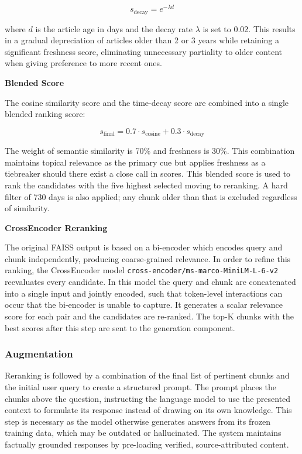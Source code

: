 \begin{equation}
    s_{\text{decay}} = e^{-\lambda d}
\end{equation}

where $d$ is the article age in days and the decay rate $\lambda$ is set to 0.02. This results in a gradual depreciation of articles older than 2 or 3 years while retaining a significant freshness score, eliminating unnecessary partiality to older content when giving preference to more recent ones.

\textbf{Blended Score}

The cosine similarity score and the time-decay score are combined into a single blended ranking score:

\begin{equation}
    s_{\text{final}} = 0.7 \cdot s_{\text{cosine}} + 0.3 \cdot s_{\text{decay}}
\end{equation}

The weight of semantic similarity is 70\% and freshness is 30\%. This combination maintains topical relevance as the primary cue but applies freshness as a tiebreaker should there exist a close call in scores. This blended score is used to rank the candidates with the five highest selected moving to reranking. A hard filter of 730 days is also applied; any chunk older than that is excluded regardless of similarity.

\textbf{CrossEncoder Reranking}

The original FAISS output is based on a bi-encoder which encodes query and chunk independently, producing coarse-grained relevance. In order to refine this ranking, the CrossEncoder model \texttt{cross-encoder/ms-marco-MiniLM-L-6-v2} reevaluates every candidate. In this model the query and chunk are concatenated into a single input and jointly encoded, such that token-level interactions can occur that the bi-encoder is unable to capture. It generates a scalar relevance score for each pair and the candidates are re-ranked. The top-K chunks with the best scores after this step are sent to the generation component.

\subsubsection{Augmentation}

Reranking is followed by a combination of the final list of pertinent chunks and the initial user query to create a structured prompt. The prompt places the chunks above the question, instructing the language model to use the presented context to formulate its response instead of drawing on its own knowledge. This step is necessary as the model otherwise generates answers from its frozen training data, which may be outdated or hallucinated. The system maintains factually grounded responses by pre-loading verified, source-attributed content.


